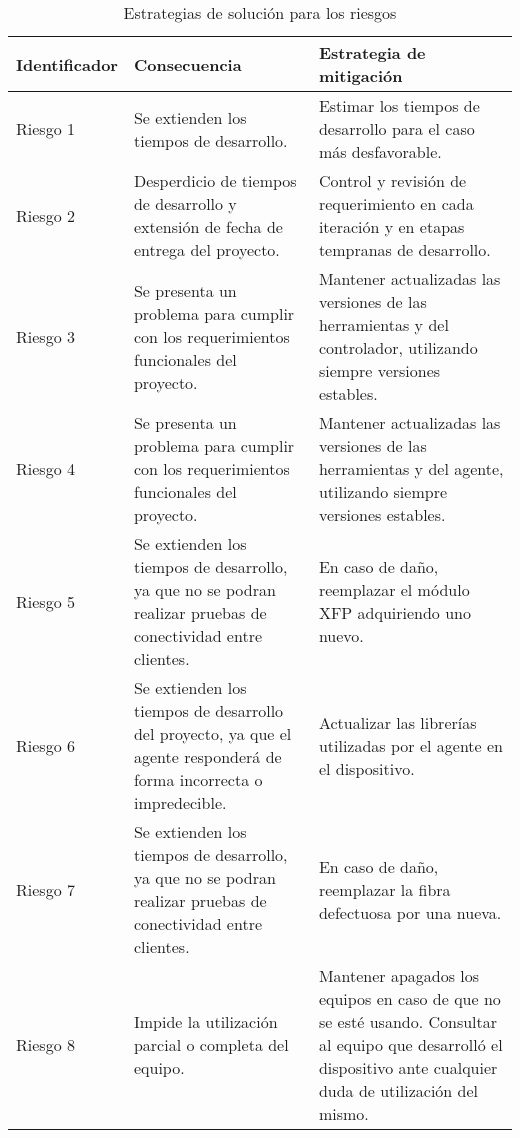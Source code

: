 \begin{table}[H]
  \centering
  \begin{tabular}{ |m{2.2cm}|m{5.5cm}|m{5.5cm}|  }

\hline
\centering
\textbf{Identificador} & \textbf{Consecuencia} & \textbf{Estrategia de mitigación} \\
\hline
\centering
Riesgo 1 & Se extienden los tiempos de desarrollo. & Estimar los tiempos de desarrollo para el caso más desfavorable.  \\
\hline
\centering
Riesgo 2 & Desperdicio de tiempos de desarrollo y extensión de fecha de entrega del proyecto. & Control y revisión de requerimiento en cada iteración y en etapas tempranas de desarrollo.  \\
\hline
\centering
Riesgo 3 & Se presenta un problema para cumplir con los requerimientos funcionales del proyecto. & Mantener actualizadas las versiones de las herramientas y del controlador, utilizando siempre versiones estables. \\
\hline
\centering
Riesgo 4 & Se presenta un problema para cumplir con los requerimientos funcionales del proyecto. & Mantener actualizadas las versiones de las herramientas y del agente, utilizando siempre versiones estables.  \\
\hline

\centering
Riesgo 5 & Se extienden los tiempos de desarrollo, ya que no se podran realizar pruebas de conectividad entre clientes.  & En caso de daño, reemplazar el módulo XFP adquiriendo uno nuevo.  \\
\hline

\centering
Riesgo 6 & Se extienden los tiempos de desarrollo del proyecto, ya que el agente responderá de forma incorrecta o impredecible. & Actualizar las librerías utilizadas por el agente en el dispositivo.  \\
\hline

\centering
Riesgo 7 & Se extienden los tiempos de desarrollo, ya que no se podran realizar pruebas de conectividad entre clientes. & En caso de daño, reemplazar la fibra defectuosa por una nueva.  \\
\hline

\centering
Riesgo 8 & Impide la utilización parcial o completa del equipo. & Mantener apagados los equipos en caso de que no se esté usando. Consultar al equipo que desarrolló el dispositivo ante cualquier duda de utilización del mismo.  \\
\hline

\end{tabular}
\caption{Estrategias de solución para los riesgos}
\label{tab:riesgos_solucion}
\end{table}
